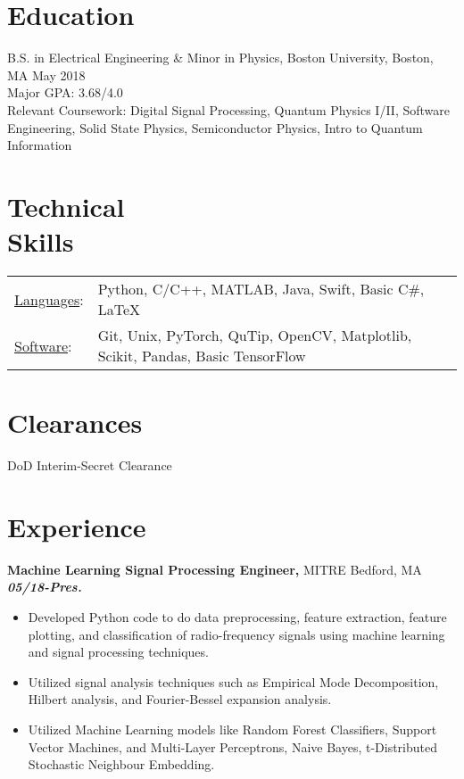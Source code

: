 \documentclass[margin]{res}
\begin{document}
\begin{resume} 
 

\section{Education} 
B.S. in Electrical Engineering \& Minor in Physics, Boston University, Boston, MA \hfill May 2018 \\
Major GPA: 3.68/4.0 \\
Relevant Coursework: Digital Signal Processing, Quantum Physics I/II, Software Engineering, Solid State Physics, Semiconductor Physics, Intro to Quantum Information 



\section{Technical \\ Skills}
   \begin{tabular}{l p{5.0in}}
     \underline{Languages}: & Python, C/C++, MATLAB, Java, Swift, Basic C\#, LaTeX \\ 
     \underline{Software}: & Git, Unix, PyTorch, QuTip, OpenCV, Matplotlib, Scikit, Pandas, Basic TensorFlow
 \end{tabular}





 
\section{Clearances}
DoD Interim-Secret Clearance 

\section{Experience}
{\bf Machine Learning Signal Processing Engineer,} MITRE Bedford, MA \hfill \textbf{\textit{05/18-Pres.}}
\begin{itemize}  pt
    \item Developed Python code to do data preprocessing, feature extraction, feature plotting, and classification of radio-frequency signals using machine learning and signal processing techniques.
    \item Utilized signal analysis techniques such as Empirical Mode Decomposition, Hilbert analysis, and Fourier-Bessel expansion analysis.
    \item Utilized Machine Learning models like Random Forest Classifiers, Support Vector Machines, and Multi-Layer Perceptrons, Naive Bayes, t-Distributed Stochastic Neighbour Embedding.
\end{itemize}




\end{resume}
\end{document}
